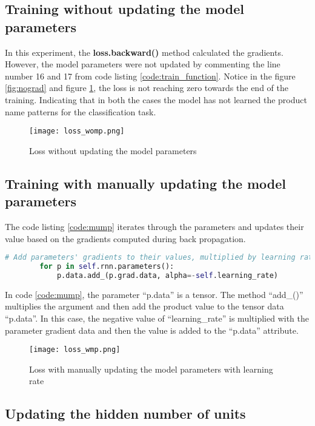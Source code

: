\subsection{Training without updating the model parameters}
In this experiment, the \textbf{loss.backward()} method calculated the gradients. However, the model parameters were not updated by commenting the line number 16 and 17 from code listing \ref{code:train_function}. Notice in the figure \ref{fig:nograd} and figure \ref{fig:womp}, the loss is not reaching zero towards the end of the training. Indicating that in both the cases the model has not learned the product name patterns for the classification task.

\begin{figure}[H]
    \centering    
    \texttt{[image: loss\_womp.png]}
    \caption{Loss without updating the model parameters}
    \label{fig:womp}
\end{figure}

\subsection{Training with manually updating the model parameters} \label{sec:tmump}

The code listing \ref{code:mump} iterates through the parameters and updates their value based on the gradients computed during back propagation. 

\begin{lstlisting}[language=Python,caption={Manual gradient updation}, label={code:mump}]
    # Add parameters' gradients to their values, multiplied by learning rate
        for p in self.rnn.parameters():
            p.data.add_(p.grad.data, alpha=-self.learning_rate)
\end{lstlisting}

In code \ref{code:mump}, the parameter ``p.data'' is a tensor. The method  ``add\_()'' multiplies the argument and then add the product value to the tensor data ``p.data''. In this case, the negative value of ``learning\_rate'' is multiplied with the parameter gradient data and then the value is added to the ``p.data'' attribute.

\begin{figure}[H]
    \centering    
    \texttt{[image: loss\_wmp.png]}
    \caption{Loss with manually updating the model parameters with learning rate}
    \label{fig:wmp}
\end{figure}


\subsection{Updating the hidden number of units}

